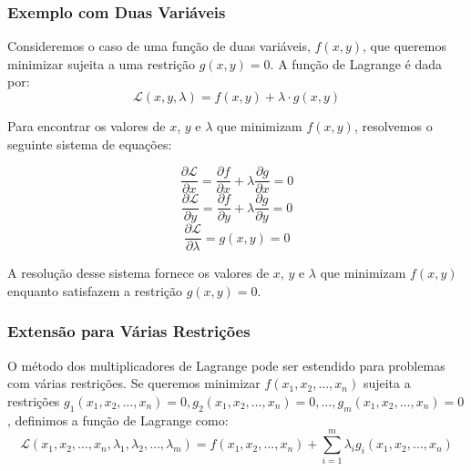 \subsubsection{Exemplo com Duas Variáveis}

Consideremos o caso de uma função de duas variáveis, $f(x, y)$, que queremos minimizar sujeita a uma restrição $g(x, y) = 0$. A função de Lagrange é dada por:
\begin{equation}
\mathcal{L}(x, y, \lambda) = f(x, y) + \lambda \cdot g(x, y)
\label{eq:lagrange_two_variable}
\end{equation}

Para encontrar os valores de $x$, $y$ e $\lambda$ que minimizam $f(x, y)$, resolvemos o seguinte sistema de equações:

\begin{equation}
\frac{\partial \mathcal{L}}{\partial x} = \frac{\partial f}{\partial x} + \lambda \frac{\partial g}{\partial x} = 0
\label{eq:partial_x}
\end{equation}
\begin{equation}
\frac{\partial \mathcal{L}}{\partial y} = \frac{\partial f}{\partial y} + \lambda \frac{\partial g}{\partial y} = 0
\label{eq:partial_y}
\end{equation}
\begin{equation}
\frac{\partial \mathcal{L}}{\partial \lambda} = g(x, y) = 0
\label{eq:partial_lambda}
\end{equation}

A resolução desse sistema fornece os valores de $x$, $y$ e $\lambda$ que minimizam $f(x, y)$ enquanto satisfazem a restrição $g(x, y) = 0$.

\subsubsection{Extensão para Várias Restrições}

O método dos multiplicadores de Lagrange pode ser estendido para problemas com várias restrições. Se queremos minimizar $f(x_1, x_2, \dots, x_n)$ sujeita a restrições $g_1(x_1, x_2, \dots, x_n) = 0, g_2(x_1, x_2, \dots, x_n) = 0, \dots, g_m(x_1, x_2, \dots, x_n) = 0$, definimos a função de Lagrange como:
\begin{equation}
\mathcal{L}(x_1, x_2, \dots, x_n, \lambda_1, \lambda_2, \dots, \lambda_m) = f(x_1, x_2, \dots, x_n) + \sum_{i=1}^{m} \lambda_i g_i(x_1, x_2, \dots, x_n)
\label{eq:lagrange_multiple_constraints}
\end{equation}

